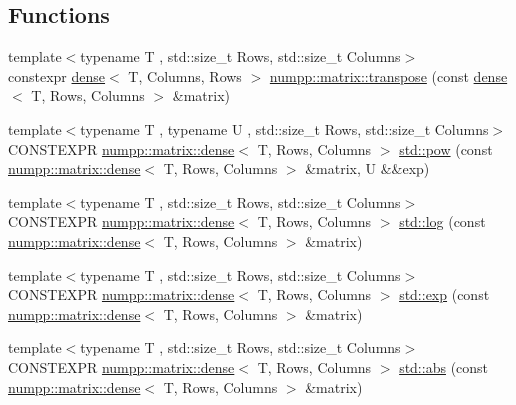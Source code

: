 \subsection*{Functions}
\begin{DoxyCompactItemize}
\item 
{\footnotesize template$<$typename T , std\+::size\+\_\+t Rows, std\+::size\+\_\+t Columns$>$ }\\constexpr \hyperlink{classnumpp_1_1matrix_1_1dense}{dense}$<$ T, Columns, Rows $>$ \hyperlink{group__numpp__structures__matrices__dense_ga07f80d900be174247ad3a3c42e9244fd}{numpp\+::matrix\+::transpose} (const \hyperlink{classnumpp_1_1matrix_1_1dense}{dense}$<$ T, Rows, Columns $>$ \&matrix)
\item 
{\footnotesize template$<$typename T , typename U , std\+::size\+\_\+t Rows, std\+::size\+\_\+t Columns$>$ }\\C\+O\+N\+S\+T\+E\+X\+PR \hyperlink{classnumpp_1_1matrix_1_1dense}{numpp\+::matrix\+::dense}$<$ T, Rows, Columns $>$ \hyperlink{group__numpp__structures__matrices__dense_ga60cc656d6425b919b2876e520854d029}{std\+::pow} (const \hyperlink{classnumpp_1_1matrix_1_1dense}{numpp\+::matrix\+::dense}$<$ T, Rows, Columns $>$ \&matrix, U \&\&exp)
\item 
{\footnotesize template$<$typename T , std\+::size\+\_\+t Rows, std\+::size\+\_\+t Columns$>$ }\\C\+O\+N\+S\+T\+E\+X\+PR \hyperlink{classnumpp_1_1matrix_1_1dense}{numpp\+::matrix\+::dense}$<$ T, Rows, Columns $>$ \hyperlink{group__numpp__structures__matrices__dense_gaad33179f3c1ba4df7469b7e3b0da7dbf}{std\+::log} (const \hyperlink{classnumpp_1_1matrix_1_1dense}{numpp\+::matrix\+::dense}$<$ T, Rows, Columns $>$ \&matrix)
\item 
{\footnotesize template$<$typename T , std\+::size\+\_\+t Rows, std\+::size\+\_\+t Columns$>$ }\\C\+O\+N\+S\+T\+E\+X\+PR \hyperlink{classnumpp_1_1matrix_1_1dense}{numpp\+::matrix\+::dense}$<$ T, Rows, Columns $>$ \hyperlink{group__numpp__structures__matrices__dense_ga5455e1c6ea8020055f4873c6c07d5810}{std\+::exp} (const \hyperlink{classnumpp_1_1matrix_1_1dense}{numpp\+::matrix\+::dense}$<$ T, Rows, Columns $>$ \&matrix)
\item 
{\footnotesize template$<$typename T , std\+::size\+\_\+t Rows, std\+::size\+\_\+t Columns$>$ }\\C\+O\+N\+S\+T\+E\+X\+PR \hyperlink{classnumpp_1_1matrix_1_1dense}{numpp\+::matrix\+::dense}$<$ T, Rows, Columns $>$ \hyperlink{group__numpp__structures__matrices__dense_gaa1377585547eae134c6ce13018e08a6b}{std\+::abs} (const \hyperlink{classnumpp_1_1matrix_1_1dense}{numpp\+::matrix\+::dense}$<$ T, Rows, Columns $>$ \&matrix)

\end{DoxyCompactItemize}
